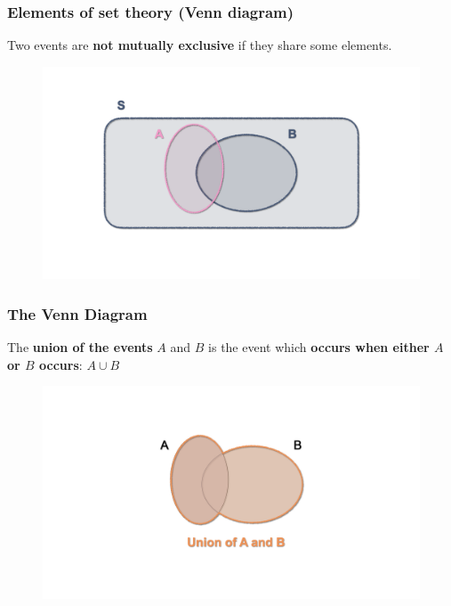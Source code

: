 \documentclass[notes=show]{beamer}\usepackage[]{graphicx}\usepackage[]{color}
\begin{document}
\begin{frame}
\frametitle{Elements of set theory (Venn diagram)}

Two events are \textbf{not mutually exclusive} if they share some elements.


\begin{figure}[h!]
\centering
\includegraphics[width=1\textwidth,height=0.7\textheight]{img/charts/charts.004.png}
\end{figure}
\end{frame}


\begin{frame}
\frametitle{The Venn Diagram}

The \textbf{union of the events} $A$ and $B$ is the event which \textbf{occurs when either $A$ or $B$ occurs}: $A \cup B$
\begin{figure}[h!]
\centering
\includegraphics[width=1\textwidth,height=0.7\textheight]{img/charts/charts.005.png}
\end{figure}

\end{frame}
\end{document}
